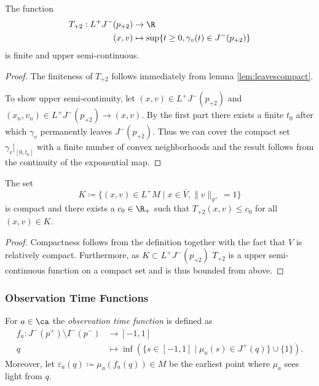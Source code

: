 \begin{proposition}[T-Function]\label{def:tfunction}
The function 
\begin{align*}
    T_{+2}:L^+J^-(p_{+2})&\to \R\\
    (x,v)&\mapsto \sup \{ t\geq 0, \gamma_v(t) \in J^-(p_{+2}) \}
\end{align*} is finite and upper semi-continuous.
\end{proposition}
\begin{proof}
The finiteness of $T_{+2}$ follows immediately from lemma \ref{lem:leavescompact}.

To show upper semi-continuity, let $(x,v)\in L^+J^-(p_{+2})$ and $(x_n,v_n)\in L^+J^-(p_{+2}) \to (x,v)$. By the first part there exists a finite $t_0$ after which $\gamma_v$ permanently leaves $J^-(p_{+2})$.
Thus we can cover the compact set $\gamma_v\rvert_{[0,t_0]}$ with a finite number of convex neighborhoods and the result follows from the continuity of the exponential map.
\end{proof}



\begin{proposition}\label{prop:tbounded}
The set 
\[
K\coloneqq \{(x,v)\in L^+M \mid x\in \overline{V}, \lVert v \rVert_{g^+}=1 \}
\] is compact and there exists a $c_0\in \R_+$ such that $T_{+2}(x,v)\leq c_0$ for all $(x,v)\in K$.
\end{proposition}
\begin{proof}
Compactness follows from the definition together with the fact that $V$ is relatively compact. Furthermore, as $K \subset L^+J^-(p_{+2})$ $T_{+2}$ is a upper semi-continuous function on a compact set and is thus bounded from above.
\end{proof}

\subsubsection{Observation Time Functions}
\begin{definition}\label{def:observationtime}
For $a\in \ca$ the \emph{observation time function} 
is defined as 
\begin{align*}
    f_a:J^-(p^+)\setminus I^-(p^-)&\to [-1,1]\\
    q&\mapsto\inf(\{s\in [-1,1] \mid \mu_a(s)\in J^+(q)\}\cup \{1\}).
\end{align*}
Moreover, let $\varepsilon_a(q)\coloneqq\mu_a(f_a(q))\in M$ be the earliest point where $\mu_a$ sees light from $q$.
\end{definition}

